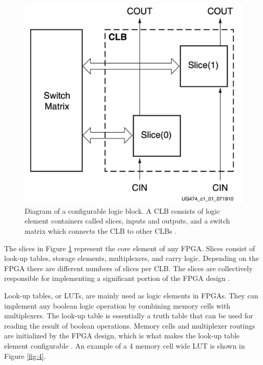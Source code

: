 \documentclass[12pt]{report}
\begin{document}
\begin{figure}[h]
    \centering
    \includegraphics[scale=0.25]{figures/clb.png}
    \caption{Diagram of a configurable logic block. A CLB consists of logic element containers called slices, inputs and outputs, and a switch matrix which connects the CLB to other CLBs \citep{XilClbMan}.}
    \label{fig:3}
\end{figure}

The slices in Figure \ref{fig:3} represent the core element of any FPGA. Slices consist of look-up tables, storage elements, multiplexers, and carry logic. Depending on the FPGA there are different numbers of slices per CLB. The slices are collectively responsible for implementing a significant portion of the FPGA design \citep{XilClbMan}.

Look-up tables, or LUTs, are mainly used as logic elements in FPGAs. They can implement any boolean logic operation by combining memory cells with multiplexers. The look-up table is essentially a truth table that can be used for reading the result of boolean operations. Memory cells and multiplexer routings are initialized by the FPGA design, which is what makes the look-up table element configurable \citep{XilFPGAIntro}. An example of a 4 memory cell wide LUT is shown in Figure \ref{fig:4}.
\end{document}
